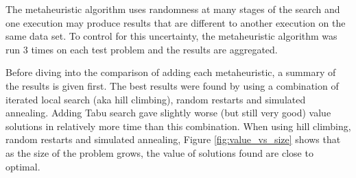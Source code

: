 The metaheuristic algorithm uses randomness at many stages of the search and one execution may produce results that are different to another execution on the same data set. To control for this uncertainty, the metaheuristic algorithm was run 3 times on each test problem and the results are aggregated.

Before diving into the comparison of adding each metaheuristic, a summary of the results is given first. The best results were found by using a combination of iterated local search (aka hill climbing), random restarts and simulated annealing. Adding Tabu search gave slightly worse (but still very good) value solutions in relatively more time than this combination. When using hill climbing, random restarts and simulated annealing, Figure \ref{fig:value_vs_size} shows that as the size of the problem grows, the value of solutions found are close to optimal.

